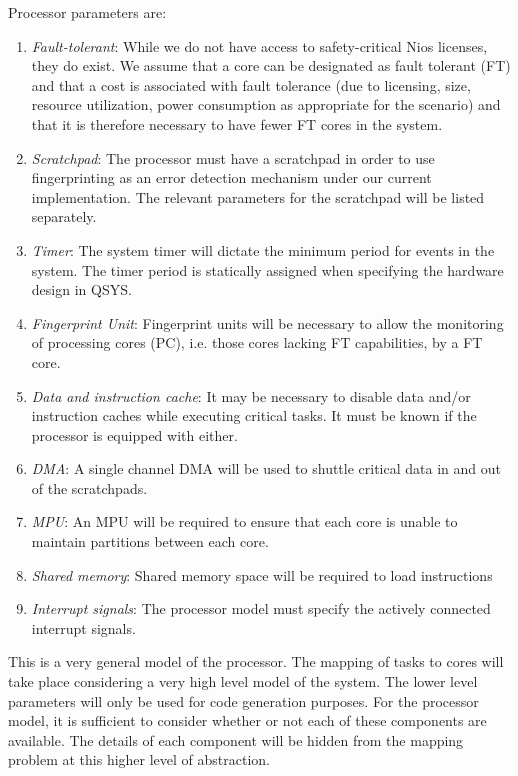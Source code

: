 \documentclass{article}
\begin{document}
Processor parameters are:
\begin{enumerate}
\item \emph{Fault-tolerant}: While we do not have access to safety-critical Nios licenses, they do exist. We assume that a core can be designated as fault tolerant (FT) and that a cost is associated with fault tolerance (due to licensing, size, resource utilization, power consumption as appropriate for the scenario) and that it is therefore necessary to have fewer FT cores in the system.

\item \emph{Scratchpad}: 
The processor must have a scratchpad in order to use fingerprinting as an error detection mechanism under our current implementation. The relevant parameters for the scratchpad will be listed separately.

\item \emph{Timer}: 
The system timer will dictate the minimum period for events in the system. The timer period is statically assigned when specifying the hardware design in QSYS.

\item \emph{Fingerprint Unit}: 
Fingerprint units will be necessary to allow the monitoring of processing cores (PC), i.e. those cores lacking FT capabilities, by a FT core.
 
\item \emph{Data and instruction cache}: 
It may be necessary to disable data and/or instruction caches while executing critical tasks. It must be known if the processor is equipped with either.

\item \emph{DMA}:
A single channel DMA will be used to shuttle critical data in and out of the scratchpads.

\item \emph{MPU}:
An MPU will be required to ensure that each core is unable to maintain partitions between each core.

\item \emph{Shared memory}:
Shared memory space will be required to load instructions

\item \emph{Interrupt signals}:
The processor model must specify the actively connected interrupt signals.

\end{enumerate}

This is a very general model of the processor. The mapping of tasks to cores will take place considering a very high level model of the system. The lower level parameters will only be used for code generation purposes. For the processor model, it is sufficient to consider whether or not each of these components are available. The details of each component will be hidden from the mapping problem at this higher level of abstraction.
\end{document}
